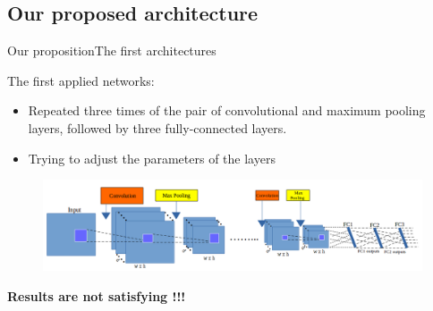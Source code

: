 \documentclass[10pt,svgnames]{beamer}
\begin{document}
\subsection{Our proposed architecture}
\begin{frame}{Our proposition}{The first architectures}
	\begin{block}{The first applied networks:}
	\begin{itemize}
		\item Repeated three times of the pair of {\color{conv}convolutional} and {\color{pool}maximum pooling} layers, followed by three fully-connected layers.
		\item Trying to adjust the parameters of the layers
	\end{itemize}	
   	\end{block}
   	\begin{center}
   		\begin{figure}[htbp]
   			\centering
    		\includegraphics[scale=.28]{images/arch_cnn2}    
		\end{figure}
		\textbf{\color{red}Results are not satisfying !!!}
   \end{center}
\end{frame}
\end{document}
